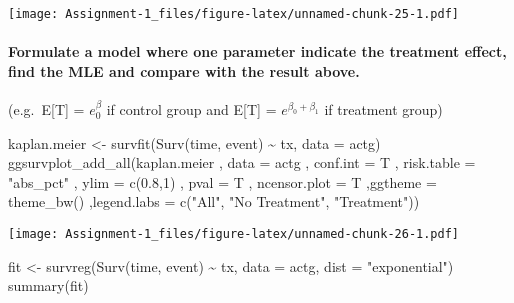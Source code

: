 \documentclass[
]{article}
\newenvironment{Shaded}{\begin{snugshade}}{\end{snugshade}}
\newcommand{\AttributeTok}[1]{\textcolor[rgb]{0.77,0.63,0.00}{#1}}
\newcommand{\DecValTok}[1]{\textcolor[rgb]{0.00,0.00,0.81}{#1}}
\newcommand{\FloatTok}[1]{\textcolor[rgb]{0.00,0.00,0.81}{#1}}
\newcommand{\FunctionTok}[1]{\textcolor[rgb]{0.00,0.00,0.00}{#1}}
\newcommand{\NormalTok}[1]{#1}
\newcommand{\OtherTok}[1]{\textcolor[rgb]{0.56,0.35,0.01}{#1}}
\newcommand{\SpecialCharTok}[1]{\textcolor[rgb]{0.00,0.00,0.00}{#1}}
\newcommand{\StringTok}[1]{\textcolor[rgb]{0.31,0.60,0.02}{#1}}
\begin{document}
\texttt{[image: Assignment-1\_files/figure-latex/unnamed-chunk-25-1.pdf]}

\hypertarget{formulate-a-model-where-one-parameter-indicate-the-treatment-effect-find-the-mle-and-compare-with-the-result-above.}{%
\paragraph{Formulate a model where one parameter indicate the treatment
effect, find the MLE and compare with the result
above.}\label{formulate-a-model-where-one-parameter-indicate-the-treatment-effect-find-the-mle-and-compare-with-the-result-above.}}

(e.g.~E{[}T{]} = \(e^\beta_0\) if control group and E{[}T{]} =
\(e^{\beta_0 + \beta_1}\) if treatment group)

\begin{Shaded}
\begin{Highlighting}[]
\NormalTok{kaplan.meier }\OtherTok{\textless{}{-}} \FunctionTok{survfit}\NormalTok{(}\FunctionTok{Surv}\NormalTok{(time, event) }\SpecialCharTok{\textasciitilde{}}\NormalTok{ tx, }\AttributeTok{data =}\NormalTok{ actg)}
\FunctionTok{ggsurvplot\_add\_all}\NormalTok{(kaplan.meier}
\NormalTok{                   , }\AttributeTok{data =}\NormalTok{ actg}
\NormalTok{                   , }\AttributeTok{conf.int =}\NormalTok{ T}
\NormalTok{                   , }\AttributeTok{risk.table =} \StringTok{"abs\_pct"}
\NormalTok{                   , }\AttributeTok{ylim =} \FunctionTok{c}\NormalTok{(}\FloatTok{0.8}\NormalTok{,}\DecValTok{1}\NormalTok{)}
\NormalTok{                   , }\AttributeTok{pval =}\NormalTok{ T}
\NormalTok{                   , }\AttributeTok{ncensor.plot =}\NormalTok{ T}
\NormalTok{                   ,}\AttributeTok{ggtheme =} \FunctionTok{theme\_bw}\NormalTok{()}
\NormalTok{                   ,}\AttributeTok{legend.labs =} \FunctionTok{c}\NormalTok{(}\StringTok{"All"}\NormalTok{, }\StringTok{"No Treatment"}\NormalTok{, }\StringTok{"Treatment"}\NormalTok{))}
\end{Highlighting}
\end{Shaded}

\texttt{[image: Assignment-1\_files/figure-latex/unnamed-chunk-26-1.pdf]}

\begin{Shaded}
\begin{Highlighting}[]
\NormalTok{fit }\OtherTok{\textless{}{-}} \FunctionTok{survreg}\NormalTok{(}\FunctionTok{Surv}\NormalTok{(time, event) }\SpecialCharTok{\textasciitilde{}}\NormalTok{ tx, }\AttributeTok{data =}\NormalTok{ actg,}
               \AttributeTok{dist =} \StringTok{"exponential"}\NormalTok{)}
\FunctionTok{summary}\NormalTok{(fit)}
\end{Highlighting}
\end{Shaded}
\end{document}
